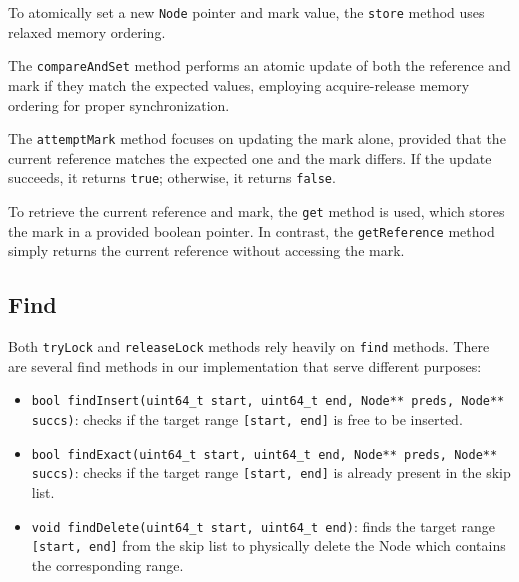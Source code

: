 To atomically set a new \texttt{Node} pointer and mark value, the \texttt{store} method uses relaxed memory ordering.

The \texttt{compareAndSet} method performs an atomic update of both the reference and mark if they match the expected values, employing acquire-release memory ordering for proper synchronization.

The \texttt{attemptMark} method focuses on updating the mark alone, provided that the current reference matches the expected one and the mark differs. If the update succeeds, it returns \texttt{true}; otherwise, it returns \texttt{false}.

To retrieve the current reference and mark, the \texttt{get} method is used, which stores the mark in a provided boolean pointer. In contrast, the \texttt{getReference} method simply returns the current reference without accessing the mark.

\begin{figure}[!p]
    \centering
    
\end{figure}

\clearpage

\subsection{Find}\label{subsec:find}

Both \texttt{tryLock} and \texttt{releaseLock} methods rely heavily on \texttt{find} methods.
There are several find methods in our implementation that serve different purposes:

\begin{itemize}
    \item \texttt{bool findInsert(uint64\_t start, uint64\_t end, Node** preds, Node** succs)}: checks if the target range \texttt{[start, end]} is free to be inserted.
    
    \item \texttt{bool findExact(uint64\_t start, uint64\_t end, Node** preds, Node** succs)}: checks if the target range \texttt{[start, end]} is already present in the skip list.
    
    \item \texttt{void findDelete(uint64\_t start, uint64\_t end)}: finds the target range \texttt{[start, end]} from the skip list to physically delete the Node which contains the corresponding range.
\end{itemize}

